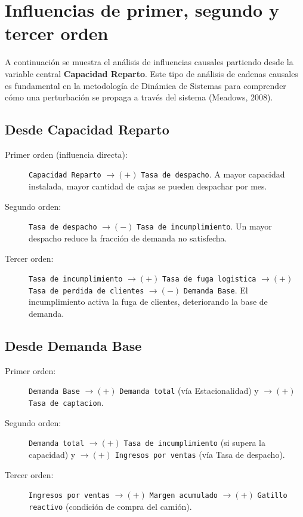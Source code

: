 \documentclass[10pt,a4paper]{article}
\begin{document}
\newpage

\section{Influencias de primer, segundo y tercer orden}

A continuación se muestra el análisis de influencias causales partiendo desde la variable central \textbf{Capacidad Reparto}. Este tipo de análisis de cadenas causales es fundamental en la metodología de Dinámica de Sistemas para comprender cómo una perturbación se propaga a través del sistema (Meadows, 2008).

\subsection{Desde Capacidad Reparto}

\begin{description}
  \item[Primer orden (influencia directa):] \texttt{Capacidad Reparto} $\rightarrow(+)$ \texttt{Tasa de despacho}. A mayor capacidad instalada, mayor cantidad de cajas se pueden despachar por mes.

  \item[Segundo orden:] \texttt{Tasa de despacho} $\rightarrow(-)$ \texttt{Tasa de incumplimiento}. Un mayor despacho reduce la fracción de demanda no satisfecha.

  \item[Tercer orden:] \texttt{Tasa de incumplimiento} $\rightarrow(+)$ \texttt{Tasa de fuga logistica} $\rightarrow(+)$ \texttt{Tasa de perdida de clientes} $\rightarrow(-)$ \texttt{Demanda Base}. El incumplimiento activa la fuga de clientes, deteriorando la base de demanda.
\end{description}

\subsection{Desde Demanda Base}

\begin{description}
  \item[Primer orden:] \texttt{Demanda Base} $\rightarrow(+)$ \texttt{Demanda total} (vía Estacionalidad) y $\rightarrow(+)$ \texttt{Tasa de captacion}.

  \item[Segundo orden:] \texttt{Demanda total} $\rightarrow(+)$ \texttt{Tasa de incumplimiento} (si supera la capacidad) y $\rightarrow(+)$ \texttt{Ingresos por ventas} (vía Tasa de despacho).

  \item[Tercer orden:] \texttt{Ingresos por ventas} $\rightarrow(+)$ \texttt{Margen acumulado} $\rightarrow(+)$ \texttt{Gatillo reactivo} (condición de compra del camión).
\end{description}
\end{document}
